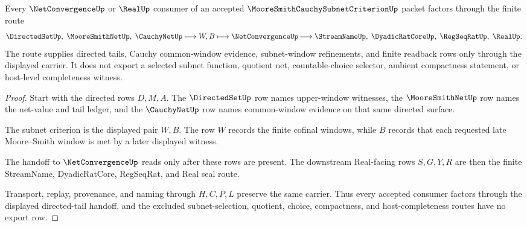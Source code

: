 \begin{theorem}
\label{thm:moore-smith-cauchy-subnet-criterion-directed-tail-handoff}
Every $\NetConvergenceUp$ or $\RealUp$ consumer of an accepted $\MooreSmithCauchySubnetCriterionUp$ packet factors through the finite route
$$
\DirectedSetUp,\;\MooreSmithNetUp,\;\CauchyNetUp
\longmapsto
W,B
\longmapsto
\NetConvergenceUp
\longmapsto
\StreamNameUp,\;\DyadicRatCoreUp,\;\RegSeqRatUp,\;\RealUp .
$$
The route supplies directed tails, Cauchy common-window evidence, subnet-window refinements, and finite readback rows only through the displayed carrier. It does not export a selected subnet function, quotient net, countable-choice selector, ambient compactness statement, or host-level completeness witness.
\end{theorem}
\begin{proof}
Start with the directed rows $D,M,A$. The $\DirectedSetUp$ row names upper-window witnesses, the $\MooreSmithNetUp$ row names the net-value and tail ledger, and the $\CauchyNetUp$ row names common-window evidence on that same directed surface.

The subnet criterion is the displayed pair $W,B$. The row $W$ records the finite cofinal windows, while $B$ records that each requested late Moore--Smith window is met by a later displayed witness.

The handoff to $\NetConvergenceUp$ reads only after these rows are present. The downstream Real-facing rows $S,G,Y,R$ are then the finite StreamName, DyadicRatCore, RegSeqRat, and Real seal route.

Transport, replay, provenance, and naming through $H,C,P,L$ preserve the same carrier. Thus every accepted consumer factors through the displayed directed-tail handoff, and the excluded subnet-selection, quotient, choice, compactness, and host-completeness routes have no export row.
\end{proof}


